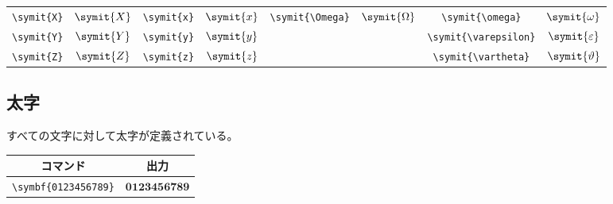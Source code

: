 \begin{longtable}{cccccccc}
    \verb|\symit{X}| & \(\symit{X}\) & \verb|\symit{x}| & \(\symit{x}\) & \verb|\symit{\Omega}|   & \(\symit{\Omega}\)   & \verb|\symit{\omega}|      & \(\symit{\omega}\)      \\
    \verb|\symit{Y}| & \(\symit{Y}\) & \verb|\symit{y}| & \(\symit{y}\) &                         &                      & \verb|\symit{\varepsilon}| & \(\symit{\varepsilon}\) \\
    \verb|\symit{Z}| & \(\symit{Z}\) & \verb|\symit{z}| & \(\symit{z}\) &                         &                      & \verb|\symit{\vartheta}|   & \(\symit{\vartheta}\)   \\
    \bottomrule
\end{longtable}

\subsection{太字}
すべての文字に対して太字が定義されている。

\begin{table}[H]
    \centering
    \begin{tabular}{cc}
        \toprule
        コマンド                  & 出力                   \\
        \midrule
        \verb|\symbf{0123456789}| & \(\symbf{0123456789}\) \\
        \bottomrule
    \end{tabular}
\end{table}

